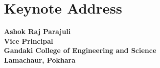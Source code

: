 \chapter[Keynote Address From The Vice Principal]{Keynote Address}
\vspace{2cm}
\textbf{Ashok Raj Parajuli}
\\
\textbf{Vice Principal}
\\
\textbf{Gandaki College of Engineering and Science}
\\
\textbf{Lamachaur, Pokhara}


